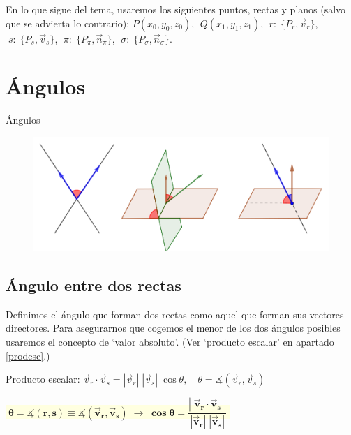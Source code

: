 En lo que sigue del tema, usaremos los siguientes puntos, rectas y planos (salvo que se advierta lo contrario): $P(x_0,y_0,z_0)$, $\;Q(x_1,y_1,z_1)$, $\;r:\; \{P_r,\vec v_r\}$,  $\;s:\; \{P_s,\vec v_s\}$,  $\;\pi:\; \{P_{\pi},\vec n_{\pi}\}$,  $\;\sigma:\; \{P_{\sigma},\vec n_{\sigma}\}$.

\section{Ángulos}

\begin{myblock}{Ángulos}
	\begin{figure}[H]
		\centering
		\includegraphics[width=1\textwidth]{imagenes/imagenes11/T11IM03.png}
	\end{figure}	
\end{myblock}




\subsection{Ángulo entre dos rectas}

Definimos el ángulo que forman dos rectas como aquel que forman sus vectores directores. Para asegurarnos que cogemos el menor de los dos ángulos posibles usaremos el concepto de `valor absoluto'. (Ver `producto escalar' en apartado \ref{prodesc}.)

Producto escalar: $\vec v_r \cdot \vec v_s=|\vec v_r|\;|\vec v_s|\; \cos \theta,\quad \theta=\measuredangle(\vec v_r,\vec v_s)$

\vspace{2mm}\centerline{
\colorbox{LightYellow}{
$\boxed{ \boldsymbol{ \;\theta=\measuredangle(r,s)\equiv \measuredangle(\vec v_r,\vec v_s) \; \to \; \cos \theta = \dfrac {|\;\vec v_r \cdot \vec v_s\;|}{|\vec v_r|\;|\vec v_s|}\; } }$
}}

\justify

